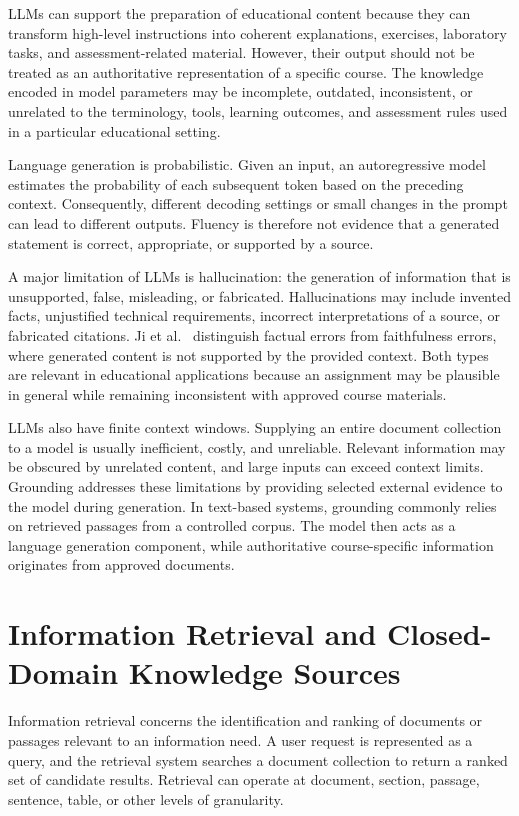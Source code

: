 \documentclass[12pt,a4paper]{report}
\numberwithin{equation}{chapter}
\begin{document}
LLMs can support the preparation of educational content because they can transform high-level instructions into coherent explanations, exercises, laboratory tasks, and assessment-related material. However, their output should not be treated as an authoritative representation of a specific course. The knowledge encoded in model parameters may be incomplete, outdated, inconsistent, or unrelated to the terminology, tools, learning outcomes, and assessment rules used in a particular educational setting.

Language generation is probabilistic. Given an input, an autoregressive model estimates the probability of each subsequent token based on the preceding context. Consequently, different decoding settings or small changes in the prompt can lead to different outputs. Fluency is therefore not evidence that a generated statement is correct, appropriate, or supported by a source.

A major limitation of LLMs is hallucination: the generation of information that is unsupported, false, misleading, or fabricated. Hallucinations may include invented facts, unjustified technical requirements, incorrect interpretations of a source, or fabricated citations. Ji et al.~\cite{Ji2023} distinguish factual errors from faithfulness errors, where generated content is not supported by the provided context. Both types are relevant in educational applications because an assignment may be plausible in general while remaining inconsistent with approved course materials.

LLMs also have finite context windows. Supplying an entire document collection to a model is usually inefficient, costly, and unreliable. Relevant information may be obscured by unrelated content, and large inputs can exceed context limits. Grounding addresses these limitations by providing selected external evidence to the model during generation. In text-based systems, grounding commonly relies on retrieved passages from a controlled corpus. The model then acts as a language generation component, while authoritative course-specific information originates from approved documents.

\section{Information Retrieval and Closed-Domain Knowledge Sources}

Information retrieval concerns the identification and ranking of documents or passages relevant to an information need. A user request is represented as a query, and the retrieval system searches a document collection to return a ranked set of candidate results. Retrieval can operate at document, section, passage, sentence, table, or other levels of granularity.
\end{document}
